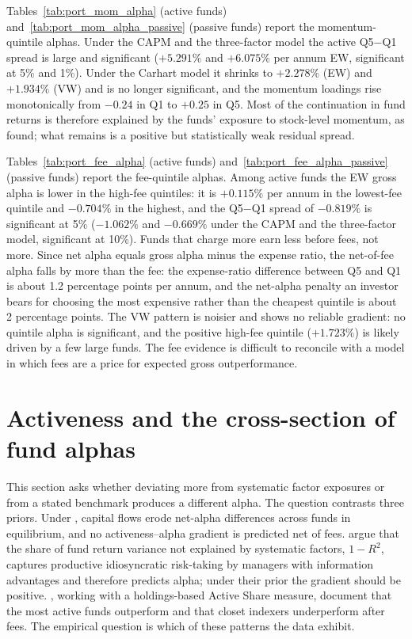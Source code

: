 \documentclass[12pt, oneside]{report}
\begin{document}


Tables~\ref{tab:port_mom_alpha} (active funds) and~\ref{tab:port_mom_alpha_passive} (passive funds) report the momentum-quintile alphas. Under
the CAPM and the three-factor model the active Q5$-$Q1 spread is large and
significant ($+5.291\%$ and $+6.075\%$ per annum EW, significant at 5\%
and 1\%). Under the Carhart model it shrinks to $+2.278\%$ (EW) and
$+1.934\%$ (VW) and is no longer significant, and the momentum loadings
rise monotonically from $-0.24$ in Q1 to $+0.25$ in Q5. Most of the
continuation in fund returns is therefore explained by the funds'
exposure to stock-level momentum, as \textcite{Carhart1997} found; what
remains is a positive but statistically weak residual spread.



Tables~\ref{tab:port_fee_alpha} (active funds) and~\ref{tab:port_fee_alpha_passive} (passive funds) report the fee-quintile alphas. Among
active funds the EW gross alpha is lower in the high-fee quintiles: it is $+0.115\%$ per
annum in the lowest-fee quintile and $-0.704\%$ in the highest, and the
Q5$-$Q1 spread of $-0.819\%$ is significant at 5\% ($-1.062\%$ and
$-0.669\%$ under the CAPM and the three-factor model, significant at
10\%). Funds that charge more earn less before fees, not more. Since net
alpha equals gross alpha minus the expense ratio, the net-of-fee alpha
falls by more than the fee: the expense-ratio difference between Q5 and
Q1 is about 1.2 percentage points per annum, and the net-alpha penalty
an investor bears for choosing the most expensive rather than the
cheapest quintile is about 2 percentage points. The VW pattern is
noisier and shows no reliable gradient: no quintile alpha is
significant, and the positive high-fee quintile ($+1.723\%$) is likely
driven by a few large funds. The fee evidence is difficult to reconcile with a
model in which fees are a price for expected gross outperformance.



\section{Activeness and the cross-section of fund alphas}
\label{sec:activeness}

\noindent This section asks whether deviating more from systematic factor
exposures or from a stated benchmark produces a different alpha. The
question contrasts three priors. Under
\textcite{BerkGreen2004}, capital flows erode net-alpha differences
across funds in equilibrium, and no activeness--alpha gradient is
predicted net of fees. \textcite{AmihudGoyenko2013} argue that the share
of fund return variance not explained by systematic factors, $1-R^2$,
captures productive idiosyncratic risk-taking by managers with
information advantages and therefore predicts alpha; under their prior
the gradient should be positive. \textcite{CremersPetajisto2009},
working with a holdings-based Active Share measure, document that the
most active funds outperform and that closet indexers underperform after
fees. The empirical question is which of these patterns the data exhibit.
\end{document}
